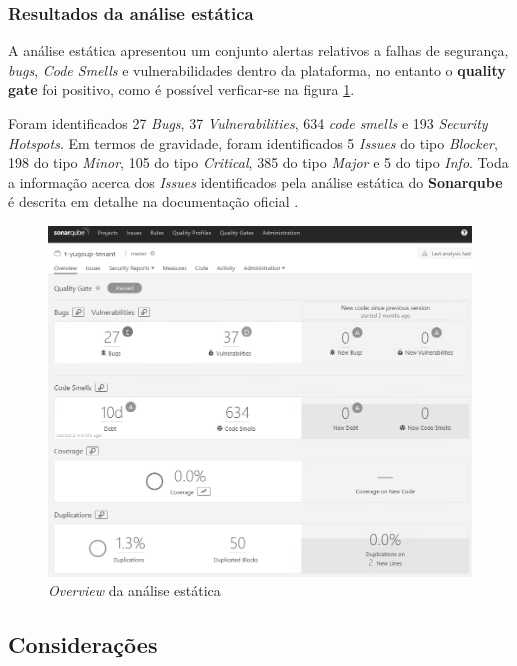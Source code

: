\subsubsection{Resultados da análise estática}

\hspace{1cm}A análise estática apresentou um conjunto alertas relativos a falhas de segurança, \textit{bugs}, \textit{Code Smells} e vulnerabilidades dentro da plataforma, no entanto o \textbf{quality gate} foi positivo, como é possível verficar-se na figura \ref{Fig:Fig71}.

\hspace{1cm}Foram identificados 27 \textit{Bugs}, 37 \textit{Vulnerabilities}, 634 \textit{code smells} e 193 \textit{Security Hotspots}. Em termos de gravidade, foram identificados 5 \textit{Issues} do tipo \textit{Blocker}, 198 do tipo \textit{Minor}, 105 do tipo \textit{Critical}, 385 do tipo \textit{Major} e 5 do tipo \textit{Info}. Toda a informação acerca dos \textit{Issues} identificados pela análise estática do \textbf{Sonarqube} é descrita em detalhe na documentação oficial \cite{sonarqubetooldocs}.

\begin{figure}[hbt!]
\centering
\includegraphics[width=0.9\linewidth]{Cap6/TenantStaticAnalysis.png}
\caption{\textit{Overview} da análise estática}
\label{Fig:Fig71}
\end{figure}

\subsection{Considerações}


